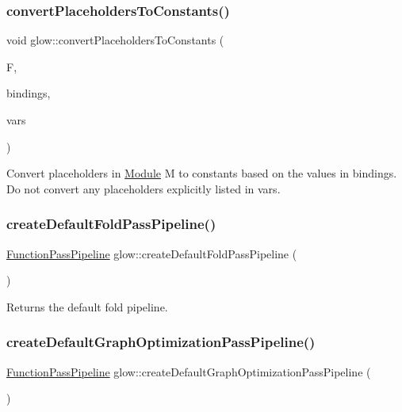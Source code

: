 \subsubsection{\texorpdfstring{convert\+Placeholders\+To\+Constants()}{convertPlaceholdersToConstants()}}
{\footnotesize\ttfamily void glow\+::convert\+Placeholders\+To\+Constants (\begin{DoxyParamCaption}\item[{\hyperlink{classglow_1_1_function}{Function} $\ast$}]{F,  }\item[{const \hyperlink{classglow_1_1_placeholder_bindings}{Placeholder\+Bindings} \&}]{bindings,  }\item[{llvm\+::\+Array\+Ref$<$ \hyperlink{classglow_1_1_placeholder}{Placeholder} $\ast$$>$}]{vars }\end{DoxyParamCaption})}

Convert placeholders in \hyperlink{classglow_1_1_module}{Module} {\ttfamily M} to constants based on the values in {\ttfamily bindings}. Do not convert any placeholders explicitly listed in {\ttfamily vars}. \mbox{\label{namespaceglow_a9e0b594543fb42b8b6ad0cc556ee9829}} 
\subsubsection{\texorpdfstring{create\+Default\+Fold\+Pass\+Pipeline()}{createDefaultFoldPassPipeline()}}
{\footnotesize\ttfamily \hyperlink{classglow_1_1_function_pass_pipeline}{Function\+Pass\+Pipeline} glow\+::create\+Default\+Fold\+Pass\+Pipeline (\begin{DoxyParamCaption}{ }\end{DoxyParamCaption})}

\begin{DoxyReturn}{Returns}
the default fold pipeline. 
\end{DoxyReturn}
\mbox{\label{namespaceglow_afd7544cbea4219b8f3c720d6a4e19481}} 
\subsubsection{\texorpdfstring{create\+Default\+Graph\+Optimization\+Pass\+Pipeline()}{createDefaultGraphOptimizationPassPipeline()}}
{\footnotesize\ttfamily \hyperlink{classglow_1_1_function_pass_pipeline}{Function\+Pass\+Pipeline} glow\+::create\+Default\+Graph\+Optimization\+Pass\+Pipeline (\begin{DoxyParamCaption}{ }\end{DoxyParamCaption})}

